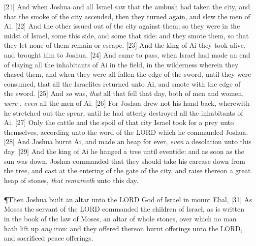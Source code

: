 [21] \textcolor[cmyk]{0.99998,1,0,0}{And when Joshua and all Israel saw that the ambush had taken the city, and that the smoke of the city ascended, then they turned again, and slew the men of Ai.}
[22] \textcolor[cmyk]{0.99998,1,0,0}{And the other issued out of the city against them; so they were in the midst of Israel, some  this side, and some  that side: and they smote them, so that they let none of them remain or escape.}
[23] \textcolor[cmyk]{0.99998,1,0,0}{And the king of Ai they took alive, and brought him to Joshua.}
[24] \textcolor[cmyk]{0.99998,1,0,0}{And  came to pass, when Israel had made an end of slaying all the inhabitants of Ai in the field, in the wilderness wherein they chased them, and when they were all fallen  the edge of the sword, until they were consumed, that all the Israelites returned unto Ai, and smote  with the edge of the sword.}
[25] \textcolor[cmyk]{0.99998,1,0,0}{And \emph{so}  was, \emph{that} all that fell that day, both of men and women, \emph{were} , \emph{even} all the men of Ai.}
[26] \textcolor[cmyk]{0.99998,1,0,0}{For Joshua drew not his hand back, wherewith he stretched out the spear, until he had utterly destroyed all the inhabitants of Ai.}
[27] \textcolor[cmyk]{0.99998,1,0,0}{Only the cattle and the spoil of that city Israel took for a prey unto themselves, according unto the word of the LORD which he commanded Joshua.}
[28] \textcolor[cmyk]{0.99998,1,0,0}{And Joshua burnt Ai, and made  an heap for ever, \emph{even} a desolation unto this day.}
[29] \textcolor[cmyk]{0.99998,1,0,0}{And the king of Ai he hanged  a tree until eventide: and as soon as the sun was down, Joshua commanded that they should take his carcase down from the tree, and cast  at the entering of the gate of the city, and raise thereon a great heap of stones, \emph{that} \emph{remaineth} unto this day.}\\
\\
\P  \textcolor[cmyk]{0.99998,1,0,0}{Then Joshua built an altar unto the LORD God of Israel in mount Ebal,}
[31] \textcolor[cmyk]{0.99998,1,0,0}{As Moses the servant of the LORD commanded the children of Israel, as  is written in the book of the law of Moses, an altar of whole stones, over which no man hath lift up \emph{any} iron: and they offered thereon burnt offerings unto the LORD, and sacrificed peace offerings.}\\
